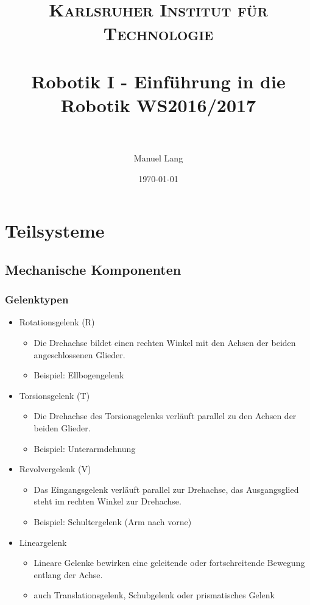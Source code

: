 \documentclass[paper=a4, fontsize=11pt]{scrartcl} %
\title{	
\normalfont \normalsize 
\textsc{Karlsruher Institut für Technologie} \\ [25pt] %
\horrule{0.5pt} \\[0.4cm] %
\huge Robotik I - Einführung in die Robotik WS2016/2017\\ %
\horrule{2pt} \\[0.5cm] %
}
\author{Manuel Lang} %
\date{\normalsize\today} %
\numberwithin{equation}{section} %
\numberwithin{figure}{section} %
\numberwithin{table}{section} %
\begin{document}
\maketitle %

{\small\tableofcontents}
\newpage


\section{Teilsysteme}

\subsection{Mechanische Komponenten}

\subsubsection{Gelenktypen}

\begin{itemize}
\item Rotationsgelenk (R)
\begin{itemize}
\item Die Drehachse bildet einen rechten Winkel mit den Achsen der beiden angeschlossenen Glieder.
\item Beispiel: Ellbogengelenk
\end{itemize}
\item Torsionsgelenk (T)
\begin{itemize}
\item Die Drehachse des Torsionsgelenks verläuft parallel zu den Achsen der beiden Glieder.
\item Beispiel: Unterarmdehnung
\end{itemize}
\item Revolvergelenk (V)
\begin{itemize}
\item Das Eingangsgelenk verläuft parallel zur Drehachse, das Ausgangsglied steht im rechten Winkel zur Drehachse.
\item Beispiel: Schultergelenk (Arm nach vorne)
\end{itemize}
\item Lineargelenk
\begin{itemize}
\item Lineare Gelenke bewirken eine geleitende oder fortschreitende Bewegung entlang der Achse.
\item auch Translationsgelenk, Schubgelenk oder prismatisches Gelenk
\end{itemize}
\end{itemize}
\end{document}
